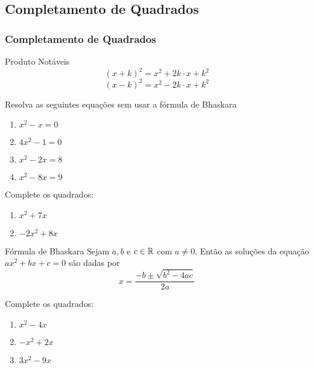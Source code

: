 \subsection*{Completamento de Quadrados}


\begin{frame}[label=comp]
	\frametitle{Completamento de Quadrados}
	
\begin{block}{Produto Notáveis}
	\[(x+k)^2=x^2+2k\cdot x+k^2\]
	\[(x-k)^2=x^2-2k\cdot x+k^2\]
\end{block}	

\begin{exe}
	Resolva as seguintes equações sem usar a fórmula de Bhaskara
	\begin{multicols}{2}
		\begin{enumerate}
			\item $x^2-x=0$
			\item $4x^2-1=0$
			\item $x^2-2x=8$
			\item $x^2-8x=9$
		\end{enumerate}
	\end{multicols}
	\medskip
\end{exe}

\end{frame}


\begin{frame}[label=comp]
	\begin{exe}
Complete os quadrados:
\begin{enumerate}
	\item $x^2+7x$
	\item $-2x^2+8x$
\end{enumerate}
	\end{exe}

\begin{block}{Fórmula de Bhaskara}
	Sejam  $a,b$ e $c\in\mathbb{R}$ com $a\neq 0$. Então as soluções da equação $ax^2+bx+c=0$ são dadas por
	\[ x=\frac{-b\pm \sqrt{b^2-4ac}}{2a}\]
\end{block}
\end{frame}

\begin{frame}[label=comp]
	
\begin{casa}
	Complete os quadrados:
\begin{enumerate}
	\item $x^2-4x$
	\item $-x^2+2x$
	\item $3x^2-9x$
\end{enumerate}
\end{casa}

\end{frame}
